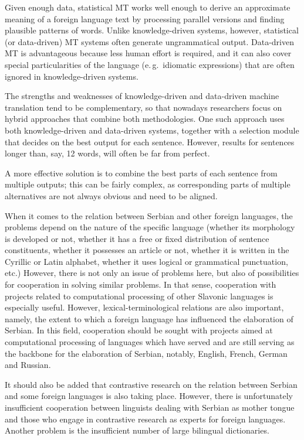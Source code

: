 \begin{multicols}{2}
Given enough data, statistical MT works well enough to derive an approximate meaning of a foreign language text by processing parallel versions and finding plausible patterns of words. Unlike knowledge-driven systems, however, statistical (or data-driven) MT systems often generate ungrammatical output. Data-driven MT is advantageous because less human effort is required, and it can also cover special particularities of the language (e.\,g.~idiomatic expressions) that are often ignored in knowledge-driven systems. 

The strengths and weaknesses of knowledge-driven and data-driven machine translation tend to be complementary, so that nowadays researchers focus on hybrid approaches that combine both methodologies. One such approach uses both knowledge-driven and data-driven systems, together with a selection module that decides on the best output for each sentence. However, results for sentences longer than, say, 12 words, will often be far from perfect. 

A more effective solution is to combine the best parts of each sentence from multiple outputs; this can be fairly complex, as corresponding parts of multiple alternatives are not always obvious and need to be aligned. 


When it comes to the relation between Serbian and other foreign languages, the problems depend on the nature of the specific language (whether its morphology is developed or not, whether it has a free or fixed distribution of sentence constituents, whether it possesses an article or not, whether it is written in the Cyrillic or Latin alphabet, whether it uses logical or grammatical punctuation, etc.) However, there is not only an issue of problems here, but also of possibilities for cooperation in solving similar problems. In that sense, cooperation with projects related to computational processing of other Slavonic languages is especially useful. However, lexical-terminological relations are also important, namely, the extent to which a foreign language has influenced the elaboration of Serbian. In this field, cooperation should be sought with projects aimed at computational processing of languages which have served and are still serving as the backbone for the elaboration of Serbian, notably, English, French, German and Russian.

It should also be added that contrastive research on the relation between Serbian and some foreign languages is also taking place. However, there is unfortunately insufficient cooperation between linguists dealing with Serbian as mother tongue and those who engage in contrastive research as experts for foreign languages. Another problem is the insufficient number of large bilingual dictionaries. 


\end{multicols}

